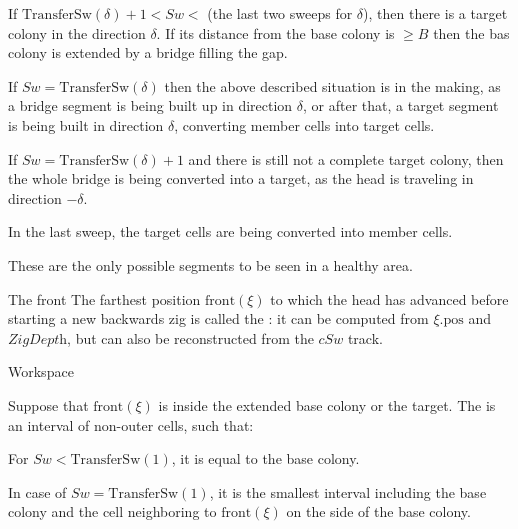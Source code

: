 \documentclass[12pt]{memoir}
\newcommand{\fld}[1]{\ensuremath{\textit{#1}}}
\def\B{B}
\newcommand{\pos}{\mathrm{pos}}
\newcommand{\Sweep}{\fld{Sw}}
\newcommand{\cSweep}{\fld{cSw}}
\newcommand{\ZigDepth}{\fld{ZigDepth}}
\newcommand{\front}{\mathrm{front}}
\newcommand{\TransferSw}{\mathrm{TransferSw}}
\begin{document}
\begin{definition}
\begin{flushdescription}
\begin{bullets}
  \item If \( \TransferSw(\delta) +1 < \Sweep <  \) (the last two sweeps for \( \delta \)),
    then there is a target colony in the direction \( \delta \).
    If its distance from the base colony is \( \ge\B \) then the bas
    colony is extended by a bridge filling the gap.
    
  \item If \( \Sweep = \TransferSw(\delta) \) then the above 
    described situation is in the making, as
    a bridge segment is being built up in direction \( \delta \), or after that,
    a target segment is being built in direction \( \delta \), converting member cells into target cells.
          
  \item If \( \Sweep = \TransferSw(\delta) +1 \) and there is still not a complete target colony,
    then the whole bridge is being converted into a target, 
    as the head is traveling in direction \( -\delta \).
    
  \item In the last sweep, the target cells are being converted into member cells.
  \end{bullets}
  These are the only possible segments to be seen in a healthy area.
        
    \item [The front] 
      The farthest position \( \front(\xi) \) to which the head has 
      advanced before starting a new backwards zig is called the :
      it can be computed from \( \xi.\pos \) and \( \ZigDepth \), but can also be reconstructed from
      the \( \cSweep \) track.

     \item[Workspace]

       \begin{sloppypar}
          Suppose that \( \front(\xi) \) is inside the extended base colony or the target.
          The  is an interval of non-outer cells, such that:         
        \end{sloppypar}
        
        \begin{bullets}
        \item For \( \Sweep < \TransferSw(1) \), it is equal to the base colony.
        \item In case of \( \Sweep = \TransferSw(1) \), it is the smallest interval including
          the base colony and the cell neighboring to
          \( \front(\xi) \) on the side of the base colony.


\end{bullets}
\end{flushdescription}
\end{definition}
\end{document}
